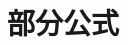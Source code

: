 \appendix
\chapter{部分公式}

\begin{comment}
    \formCount=0
    \section{极限状态设计}

    \subsection{荷载标准值}

    \formDesc{结构抗力$R$, 承受作用效应的能力, 是一个随机变量}

    \begin{equation}
        R = R(\text{材料强度, 几何尺寸, 计算模式等})
    \end{equation}

    \formDesc{荷载的标准值$P_k$}
    \begin{align}
        P_k = \mu_P + 1.645\sigma_P, \quad \mu_P\text{为均值}, \sigma_P\text{为标准差}
    \end{align}

    \formDesc{永久荷载标准值$G_k$, 按照结构尺寸与材料容重确定}
    \begin{equation}
        G_k = \rho\cdot V
    \end{equation}

    \formDesc{可变荷载标准值$Q_k$}
    \begin{align}
        \text{办公楼, } & \text{住宅楼面均布{\bf 活荷载标准值}$Q_k$为$2.0KN/m^2$}\cr
        \text{办公楼:} \quad & Q_k = \mu_P + 3.16\quad\sigma_P  >95\%\text{的保证率}\cr
        \text{住宅:} \quad & Q_k = \mu_P + 2.38\quad\sigma_P  >95\%\text{的保证率}
    \end{align}

    \subsection{强度标准值}

    \formDesc{材料强度标准值$f_k$}
    \begin{equation}
        f_k = \mu_f - \alpha\sigma_f, \quad\quad \alpha = 1.645
    \end{equation}

    \formDesc{钢筋的强度标准值}
    \par\bigskip
    钢材出厂前抽样检查标准为"废品限值", 相当于屈服强度平均值减去两倍标准差$(\alpha = 2)$所得数值, 保证率为$94.73\%$.\par
    \begin{enumerate}
        \item 对于明显屈服点的热轧钢筋, 取$f_{yk} = \sigma_y$
        \item 对于无明显屈服点的钢筋, $f_{yk} = 0.8\sigma_b$作为条件屈服点
    \end{enumerate}


\end{comment}

